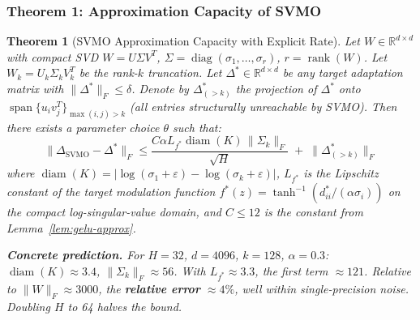 \documentclass[conference]{IEEEtran}
\newtheorem{theorem}{Theorem}[section]
\newcommand{\RR}{\mathbb{R}}
\newcommand{\diag}{\operatorname{diag}}
\newcommand{\rank}{\operatorname{rank}}
\newcommand{\diam}{\operatorname{diam}}
\newcommand{\Span}{\operatorname{span}}
\begin{document}
\subsubsection{Theorem 1: Approximation Capacity of SVMO}

\begin{theorem}[SVMO Approximation Capacity with Explicit Rate]
\label{thm:svmo-approx}
Let $W \in \RR^{d \times d}$ with compact SVD $W = U\Sigma V^T$, $\Sigma = \diag(\sigma_1,\dots,\sigma_r)$, $r = \rank(W)$. Let $W_k = U_k \Sigma_k V_k^T$ be the rank-$k$ truncation. Let $\Delta^* \in \RR^{d \times d}$ be any target adaptation matrix with $\|\Delta^*\|_F \leq \delta$. Denote by $\Delta^*_{(>k)}$ the projection of $\Delta^*$ onto $\Span\{u_i v_j^T\}_{\max(i,j) > k}$ (all entries structurally unreachable by SVMO). Then there exists a parameter choice $\theta$ such that:
\begin{equation}
\|\Delta_{\text{SVMO}} - \Delta^*\|_F \leq \frac{C \alpha L_{f^*} \diam(K) \,\|\Sigma_k\|_F}{\sqrt{H}} \;+\; \|\Delta^*_{(>k)}\|_F
\end{equation}
where $\diam(K) = |\log(\sigma_1+\varepsilon) - \log(\sigma_k+\varepsilon)|$, $L_{f^*}$ is the Lipschitz constant of the target modulation function $f^*(z) = \tanh^{-1}(d_{ii}^*/(\alpha\sigma_i))$ on the compact log-singular-value domain, and $C \leq 12$ is the constant from Lemma~\ref{lem:gelu-approx}.

\textbf{Concrete prediction.} For $H{=}32$, $d{=}4096$, $k{=}128$, $\alpha{=}0.3$: $\diam(K) \approx 3.4$, $\|\Sigma_k\|_F \approx 56$. With $L_{f^*} \approx 3.3$,
the first term $\approx 121$. Relative to $\|W\|_F \approx 3000$, the \textbf{relative error} $\approx 4\%$, well within single-precision noise. Doubling $H$ to 64 halves the bound.
\end{theorem}
\end{document}
